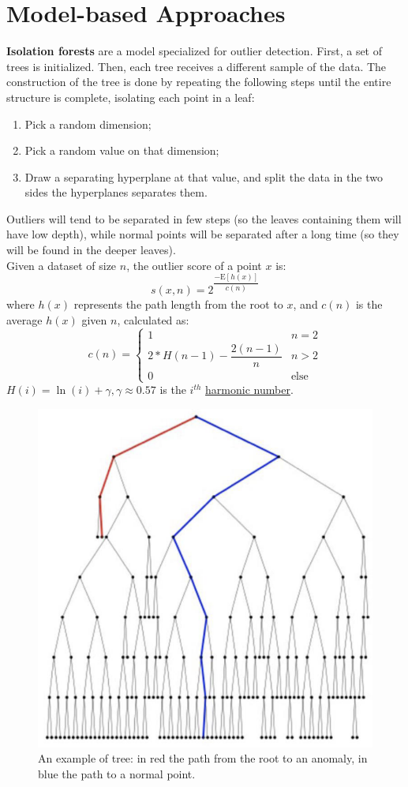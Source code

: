 \section{Model-based Approaches}

\textbf{Isolation forests} are a model specialized for outlier detection. First, a set of trees is initialized. Then, each tree receives a different sample of the data. The construction of the tree is done by repeating the following steps until the entire structure is complete, isolating each point in a leaf:
\begin{enumerate}
    \item Pick a random dimension;
    \item Pick a random value on that dimension;
    \item Draw a separating hyperplane at that value, and split the data in the two sides the hyperplanes separates them.
\end{enumerate}
Outliers will tend to be separated in few steps (so the leaves containing them will have low depth), while normal points will be separated after a long time (so they will be found in the deeper leaves). \\
Given a dataset of size $n$, the outlier score of a point $x$ is:
\begin{equation*}
    s(x,n) = 2^{\dfrac{-\mathrm{E}[h(x)]}{c(n)}}
\end{equation*}
where $h(x)$ represents the path length from the root to $x$, and $c(n)$ is the average $h(x)$ given $n$, calculated as:
\begin{equation*}
    c(n) = \begin{cases}
        1 & n = 2 \\
        2 * H(n-1) - \dfrac{2(n-1)}{n} & n > 2 \\
        0 & \text{else}
    \end{cases}
\end{equation*}
$H(i) = \ln(i) + \gamma, \gamma \approx 0.57$ is the $i^{th}$ \href{https://en.wikipedia.org/wiki/Harmonic_number}{harmonic number}.
\begin{figure}[ht]
    \centering
    \includegraphics[width=0.35\linewidth]{img/isolation_tree.png}
    \caption{An example of tree: in red the path from the root to an anomaly, in blue the path to a normal point.}
    \label{fig:isolation-tree}
\end{figure}
